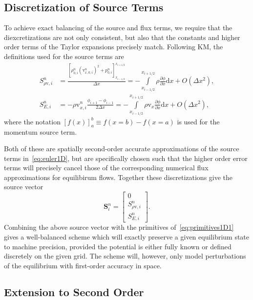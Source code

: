 \subsection{Discretization of Source Terms}
\label{subsec:sources}

To achieve exact balancing of the source and flux terms, we require that the diexcretizations are not only consistent, but also that the constants and higher order terms of the Taylor expansions precisely match. Following KM, the definitions used for the source terms are
\begin{align}
S_{\rho \mathrm{v},i}^n&=\frac{\left[\rho_{0,i}^n(\mathrm{v}_{x,0,i}^n)^2+p_{0,i}^n\right]_{x_{i-1/2}}^{x_{i+1/2}}}{\Delta x}=-\int\limits_{x_{i-1/2}}^{x_{i+1/2}}\rho \frac{\partial \phi}{\partial x}\textrm{d}x+O\left(\Delta x^2\right), \label{eq:momentumSource} \\
S_{E,i}^n&=-\rho \mathrm{v}_{x,i}^n\frac{\phi_{i+1}-\phi_{i-1}}{2\Delta x}=-\int\limits_{x_{i-1/2}}^{x_{i+1/2}}\rho \mathrm{v}_x \frac{\partial \phi}{\partial x}\textrm{d}x+O\left(\Delta x^2\right), \label{eq:energySource}
\end{align}
where the notation $\left[f(x)\right]_a^b\equiv f(x=b)-f(x=a)$ is used for the momentum source term.

Both of these are spatially second-order accurate approximations of the source terms in~\eqref{eq:euler1D}, but are specifically chosen such that the higher order error terms will precisely cancel those of the corresponding numerical flux approximations for equilibirum flows. Together these discretizations give the source vector
\begin{equation}
\mathbf{S}_i^n=
\begin{bmatrix}
0 \\ S_{\rho \mathrm{v},i}^n \\ S_{E,i}^n
\end{bmatrix}.
\end{equation}
Combining the above source vector with the primitives of~\eqref{eq:primitives1D1} gives a well-balanced scheme which will exactly preserve a given equilibrium state to machine precision, provided the potential is either fully known or defined discretely on the given grid. The scheme will, however, only model perturbations of the equilibrium with first-order accuracy in space.

\subsection{Extension to Second Order}
\label{subsec:secondOrder}

